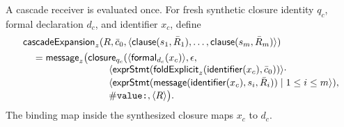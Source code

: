 A cascade receiver is evaluated once.  For fresh synthetic closure identity
$q_c$, formal declaration $d_c$, and identifier $x_c$, define
\begin{equation}\label{eq:cascade-expansion}
\begin{aligned}
 &\mathsf{cascadeExpansion}_{z}
   (R,\bar c_0,
      \langle\kw{clause}(s_1,\bar R_1),\ldots,
             \kw{clause}(s_m,\bar R_m)\rangle)\\
 &\quad=\kw{message}_{z}\bigl(
   \kw{closure}_{q_c}(\langle\kw{formal}_{d_c}(x_c)\rangle,\epsilon,\\[-1mm]
 &\hspace{31mm}\langle
   \kw{exprStmt}(\mathsf{foldExplicit}_{z}
      (\kw{identifier}(x_c),\bar c_0))\rangle\cdot\\[-1mm]
 &\hspace{31mm}\langle
   \kw{exprStmt}(\kw{message}(\kw{identifier}(x_c),s_i,\bar R_i))
   \mid1\le i\le m\rangle),\\[-1mm]
 &\hspace{31mm}\selsym{value:},\langle R\rangle\bigr).
\end{aligned}
\end{equation}
The binding map inside the synthesized closure maps $x_c$ to $d_c$.

